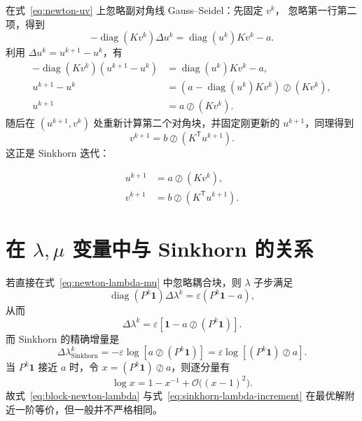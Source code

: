 \documentclass[11pt,a4paper]{ctexart}
\newcommand{\diag}{\operatorname{diag}}
\newcommand{\vone}{\bm{1}}
\newcommand{\trans}{\mathsf{T}}
\begin{document}
在式~\eqref{eq:newton-uv} 上忽略副对角线 Gauss--Seidel：先固定 $v^k$，
忽略第一行第二项，得到
\begin{equation}
  -\diag(Kv^k)\Delta u^k
  =\diag(u^k)Kv^k-a.
\end{equation}
利用 $\Delta u^k=u^{k+1}-u^k$，有
\begin{equation}
\begin{aligned}
  -\diag(Kv^k)(u^{k+1}-u^k)
  &=\diag(u^k)Kv^k-a,\\
  u^{k+1}-u^k
  &=\left(a-\diag(u^k)Kv^k\right)\oslash(Kv^k),\\
  u^{k+1}
  &=a\oslash(Kv^k).
\end{aligned}
\end{equation}
随后在 $(u^{k+1},v^k)$ 处重新计算第二个对角块，并固定刚更新的 $u^{k+1}$，同理得到
\begin{equation}
  v^{k+1}=b\oslash(K^{\trans}u^{k+1}).
\end{equation}
这正是 Sinkhorn 迭代：
\begin{resultbox}
\begin{equation}
\boxed{
\begin{aligned}
  u^{k+1}&=a\oslash(Kv^k),\\
  v^{k+1}&=b\oslash(K^{\trans}u^{k+1}).
\end{aligned}}
\end{equation}
\end{resultbox}

\section{在 $\lambda,\mu$ 变量中与 Sinkhorn 的关系}

若直接在式~\eqref{eq:newton-lambda-mu} 中忽略耦合块，则 $\lambda$ 子步满足
\begin{equation}
  \diag(P^k\vone)\Delta\lambda^k
  =\varepsilon(P^k\vone-a),
\end{equation}
从而
\begin{equation}\label{eq:block-newton-lambda}
  \Delta\lambda^k
  =\varepsilon\left[\vone-a\oslash(P^k\vone)\right].
\end{equation}
而 Sinkhorn 的精确增量是
\begin{equation}\label{eq:sinkhorn-lambda-increment}
  \Delta\lambda^k_{\mathrm{Sinkhorn}}
  =-\varepsilon\log\!\left[a\oslash(P^k\vone)\right]
  =\varepsilon\log\!\left[(P^k\vone)\oslash a\right].
\end{equation}
当 $P^k\vone$ 接近 $a$ 时，令 $x=(P^k\vone)\oslash a$，则逐分量有
\[
  \log x=1-x^{-1}+\mathcal{O}\bigl((x-1)^2\bigr).
\]
故式~\eqref{eq:block-newton-lambda} 与式~\eqref{eq:sinkhorn-lambda-increment}
在最优解附近一阶等价，但一般并不严格相同。
\end{document}
